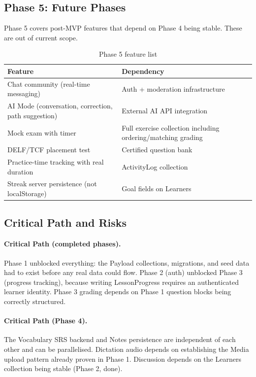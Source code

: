 \subsection{Phase 5: Future Phases}
\label{sec:phase5}

Phase 5 covers post-MVP features that depend on Phase 4 being stable. These are out of current scope.

\begin{table}[H]
\centering
\begin{tabularx}{\linewidth}{X X}
\toprule
Feature & Dependency \\
\midrule
Chat community (real-time messaging) & Auth + moderation infrastructure \\
AI Mode (conversation, correction, path suggestion) & External AI API integration \\
Mock exam with timer & Full exercise collection including ordering/matching grading \\
DELF/TCF placement test & Certified question bank \\
Practice-time tracking with real duration & ActivityLog collection \\
Streak server persistence (not localStorage) & Goal fields on Learners \\
\bottomrule
\end{tabularx}
\caption{Phase 5 feature list}
\end{table}

\subsection{Critical Path and Risks}

\paragraph{Critical Path (completed phases).}
Phase 1 unblocked everything: the Payload collections, migrations, and seed data had to exist before any real data could flow. Phase 2 (auth) unblocked Phase 3 (progress tracking), because writing LessonProgress requires an authenticated learner identity. Phase 3 grading depends on Phase 1 question blocks being correctly structured.

\paragraph{Critical Path (Phase 4).}
The Vocabulary SRS backend and Notes persistence are independent of each other and can be parallelised. Dictation audio depends on establishing the Media upload pattern already proven in Phase 1. Discussion depends on the Learners collection being stable (Phase 2, done).

